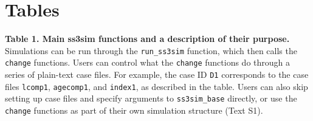 \clearpage

\section*{Tables}

\textbf{Table 1. Main ss3sim functions and a description of their purpose.}
Simulations can be run through the \texttt{run\_ss3sim} function, which then
calls the \texttt{change} functions. Users can control what the \texttt{change}
functions do through a series of plain-text case files. For example, the case
ID \texttt{D1} corresponds to the case files \texttt{lcomp1},
\texttt{agecomp1}, and \texttt{index1}, as described in the table. Users can
also skip setting up case files and specify arguments to \texttt{ss3sim\_base}
directly, or use the \texttt{change} functions as part of their own simulation
structure (Text S1).

